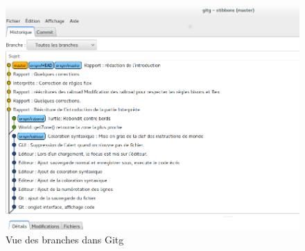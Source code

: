 \begin{figure}[h]
\centering
\includegraphics[scale=0.35]{doc/gestionProjet/gitbranche.png}
\caption{\label{Gitg} Vue des branches dans Gitg}
\end{figure}
